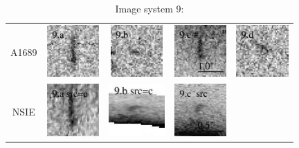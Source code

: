 \documentclass[useAMS,usenatbib]{mn2e}
\begin{document}
\begin{table}
  \caption{Image system 9:}\vspace{0mm}
  \begin{tabular}{ccccc}
    \multicolumn{1}{m{1cm}}{{\Large A1689}}
    & \multicolumn{1}{m{1.7cm}}{\includegraphics[height=2.00cm,clip]{figs/nsie_img/eA1689_F850LPa.img_9_a.ps}}
    & \multicolumn{1}{m{1.7cm}}{\includegraphics[height=2.00cm,clip]{figs/nsie_img/eA1689_F850LPa.img_9_b.ps}}
    & \multicolumn{1}{m{1.7cm}}{\includegraphics[height=2.00cm,clip]{figs/nsie_img/eA1689_F850LPa.img_9_c.ps}}
    & \multicolumn{1}{m{1.7cm}}{\includegraphics[height=2.00cm,clip]{figs/nsie_img/eA1689_F850LPa.img_9_d.ps}} \\
    \multicolumn{1}{m{1cm}}{{\Large NSIE}}
    & \multicolumn{1}{m{1.7cm}}{\includegraphics[height=2.00cm,clip]{figs/nsie_img/eA1689_F850LPa.pre_9_a_c_tri.ps}}
    & \multicolumn{1}{m{1.7cm}}{\includegraphics[height=2.00cm,clip]{figs/nsie_img/eA1689_F850LPa.pre_9_b_c_tri.ps}}
    & \multicolumn{1}{m{1.7cm}}{\includegraphics[height=2.00cm,clip]{figs/nsie_img/eA1689_F850LPa.src_9_c.ps}}

\end{tabular}
\end{table}
\end{document}

